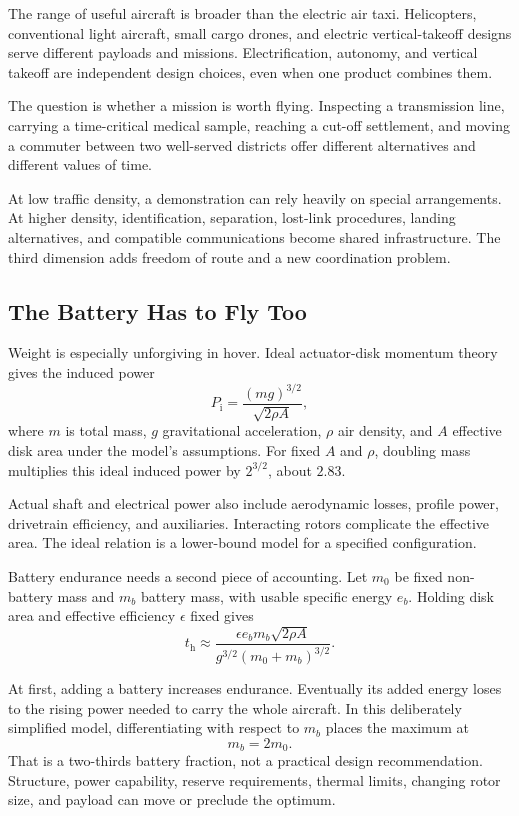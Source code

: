 \documentclass[11pt,openany]{book}
\begin{document}
The range of useful aircraft is broader than the electric air taxi. Helicopters, conventional light aircraft, small cargo drones, and electric vertical-takeoff designs serve different payloads and missions. Electrification, autonomy, and vertical takeoff are independent design choices, even when one product combines them.

The question is whether a mission is worth flying. Inspecting a transmission line, carrying a time-critical medical sample, reaching a cut-off settlement, and moving a commuter between two well-served districts offer different alternatives and different values of time.

At low traffic density, a demonstration can rely heavily on special arrangements. At higher density, identification, separation, lost-link procedures, landing alternatives, and compatible communications become shared infrastructure. The third dimension adds freedom of route and a new coordination problem.

\subsection{The Battery Has to Fly Too}

Weight is especially unforgiving in hover. Ideal actuator-disk momentum theory gives the induced power
\begin{equation}
 P_{\mathrm i}=\frac{(mg)^{3/2}}{\sqrt{2\rho A}},
\end{equation}
where $m$ is total mass, $g$ gravitational acceleration, $\rho$ air density, and $A$ effective disk area under the model's assumptions. For fixed $A$ and $\rho$, doubling mass multiplies this ideal induced power by $2^{3/2}$, about $2.83$.

Actual shaft and electrical power also include aerodynamic losses, profile power, drivetrain efficiency, and auxiliaries. Interacting rotors complicate the effective area. The ideal relation is a lower-bound model for a specified configuration.

Battery endurance needs a second piece of accounting. Let $m_0$ be fixed non-battery mass and $m_b$ battery mass, with usable specific energy $e_b$. Holding disk area and effective efficiency $\epsilon$ fixed gives
\begin{equation}
 t_{\mathrm h}\approx
 \frac{\epsilon e_b m_b\sqrt{2\rho A}}
      {g^{3/2}(m_0+m_b)^{3/2}}.
\end{equation}

At first, adding a battery increases endurance. Eventually its added energy loses to the rising power needed to carry the whole aircraft. In this deliberately simplified model, differentiating with respect to $m_b$ places the maximum at
\begin{equation}
 m_b=2m_0.
\end{equation}
That is a two-thirds battery fraction, not a practical design recommendation. Structure, power capability, reserve requirements, thermal limits, changing rotor size, and payload can move or preclude the optimum.
\end{document}
